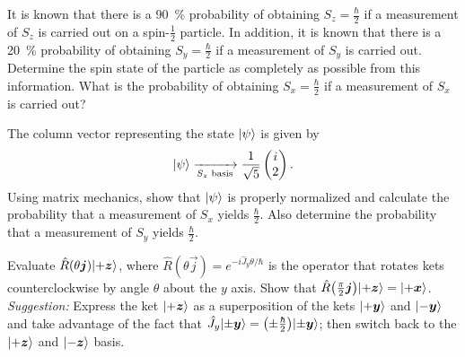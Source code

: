\documentclass{../phys116}
\begin{document}
\begin{solution}
\end{solution}

\begin{exercise}
  It is known that there is a \SI{90}{\percent} probability of
  obtaining \(S_z = \frac \hbar 2\) if a measurement of \(S_z\) is
  carried out on a spin-\(\frac 1 2\) particle.  In addition, it is
  known that there is a \SI{20}{\percent} probability of obtaining
  \(S_y = \frac \hbar 2\) if a measurement of \(S_y\) is carried out.
  Determine the spin state of the particle as completely as possible
  from this information.  What is the probability of obtaining
  \(S_x = \frac \hbar 2\) if a measurement of \(S_x\) is carried out?
\end{exercise}

\begin{solution}
\end{solution}

\begin{exercise}
  The column vector representing the state \(\lvert\psi\rangle\) is given by
  \[
    \lvert\psi\rangle \xrightarrow[\text{\(S_z\) basis}]{} \frac{1}{\sqrt 5}
    \begin{pmatrix} i \\ 2 \end{pmatrix}.
  \]
  Using matrix mechanics, show that \(\lvert\psi\rangle\) is properly
  normalized and calculate the probability that a measurement of
  \(S_x\) yields \(\frac \hbar 2\).  Also determine the probability
  that a measurement of \(S_y\) yields \(\frac \hbar 2\).
\end{exercise}

\begin{solution}
\end{solution}

\begin{exercise}
  Evaluate \(\hat R(\theta \vec j) \ket{+\vec z}\), where
  \(\hat R(\theta \vec j) = e^{-i \hat J_y \theta/\hbar}\) is the
  operator that rotates kets counterclockwise by angle \(\theta\)
  about the \(y\) axis.  Show that
  \(\hat R\prn*{\frac \pi 2 \vec j} \ket{+\vec z} = \ket{+\vec x}\).
  \textit{Suggestion:} Express the ket \(\ket{+\vec z}\) as a
  superposition of the kets \(\ket{+\vec y}\) and \(\ket{-\vec y}\)
  and take advantage of the fact that
  \(\hat J_y \ket{\pm \vec y} = \prn*{\pm \frac \hbar 2} \ket{\pm \vec
    y}\); then switch back to the \(\ket{+\vec z}\) and
  \(\ket{-\vec z}\) basis.
\end{exercise}

\begin{solution}
\end{solution}
\end{document}
